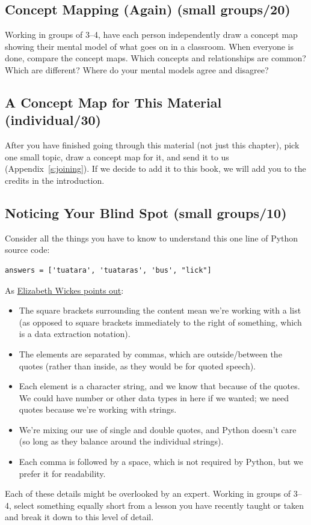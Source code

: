 \subsection*{Concept Mapping (Again) (small groups/20)}

Working in groups of 3--4, have each person independently draw a concept
map showing their mental model of what goes on in a classroom. When
everyone is done, compare the concept maps. Which concepts and
relationships are common? Which are different? Where do your mental
models agree and disagree?

\subsection*{A Concept Map for This Material (individual/30)}

After you have finished going through this material (not just this
chapter), pick one small topic, draw a concept map for it, and send it
to us (Appendix~\ref{s:joining}). If we decide to add it to this book, we
will add you to the credits in the introduction.

\subsection*{Noticing Your Blind Spot (small groups/10)}

Consider all the things you have to know to understand this one line of
Python source code:

\begin{verbatim}
answers = ['tuatara', 'tuataras', 'bus', "lick"]
\end{verbatim}

As \href{https://twitter.com/elliewix/status/981285432922202113}{Elizabeth Wickes points out}:

\begin{itemize}
\item
  The square brackets surrounding the content mean we're working with
  a list (as opposed to square brackets immediately to the right of
  something, which is a data extraction notation).
\item
  The elements are separated by commas, which are outside/between the
  quotes (rather than inside, as they would be for quoted speech).
\item
  Each element is a character string, and we know that because of the
  quotes. We could have number or other data types in here if we
  wanted; we need quotes because we're working with strings.
\item
  We're mixing our use of single and double quotes, and Python doesn't
  care (so long as they balance around the individual strings).
\item
  Each comma is followed by a space, which is not required by Python,
  but we prefer it for readability.
\end{itemize}

Each of these details might be overlooked by an expert. Working in
groups of 3--4, select something equally short from a lesson you have
recently taught or taken and break it down to this level of detail.
